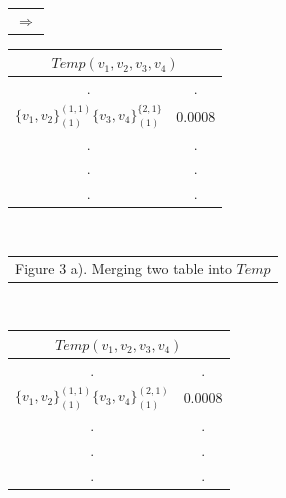 \documentclass[11pt]{article}
\begin{document}
\begin{table}[!htb]
\begin{minipage}{.06\linewidth}
\begin{tabular}{c}
     $ \Rightarrow$\\
        \end{tabular}
    \end{minipage}%
     \begin{minipage}{.3\linewidth}
      \centering
     \begin{tabular}{cc}
\multicolumn{2}{c}{$Temp(v_1,v_2,v_3,v_4)$}                           \\ \hline
\multicolumn{1}{|c}{.} & \multicolumn{1}{|c|}{.} \\ \hline
  \multicolumn{1}{|l}{$\{v_1,v_2\}^{(1,1)}_{(1)}\{v_3,v_4\}^{\{2,1\}}_{(1)}$} & \multicolumn{1}{|l|}{$0.0008$} \\ \hline         
                   \multicolumn{1}{|c}{.} & \multicolumn{1}{|c|}{.} \\ \hline                 
                   \multicolumn{1}{|c}{.} & \multicolumn{1}{|c|}{.} \\ \hline
                   \multicolumn{1}{|c}{.} & \multicolumn{1}{|c|}{.} \\ \hline        
\end{tabular}
    \end{minipage}\\
    \begin{minipage}{1.0\linewidth}
       \centering
  
        \begin{tabular}{c}
Figure 3 a). Merging two table into $Temp$
        \end{tabular}
    \end{minipage}\\
     \begin{minipage}{.4\linewidth}
      \centering
     \begin{tabular}{cc}
\multicolumn{2}{c}{$Temp(v_1,v_2,v_3,v_4)$}                           \\ \hline
\multicolumn{1}{|c}{.} & \multicolumn{1}{|c|}{.} \\ \hline
  \multicolumn{1}{|l}{$\{v_1,v_2\}^{(1,1)}_{(1)}\{v_3,v_4\}^{(2,1)}_{(1)}$} & \multicolumn{1}{|l|}{$0.0008$} \\ \hline         
                   \multicolumn{1}{|c}{.} & \multicolumn{1}{|c|}{.} \\ \hline                 
                   \multicolumn{1}{|c}{.} & \multicolumn{1}{|c|}{.} \\ \hline
                   \multicolumn{1}{|c}{.} & \multicolumn{1}{|c|}{.} \\ \hline        
\end{tabular}
    \end{minipage}%
     \begin{minipage}{.06\linewidth}
   

\end{minipage}
\end{table}
\end{document}
